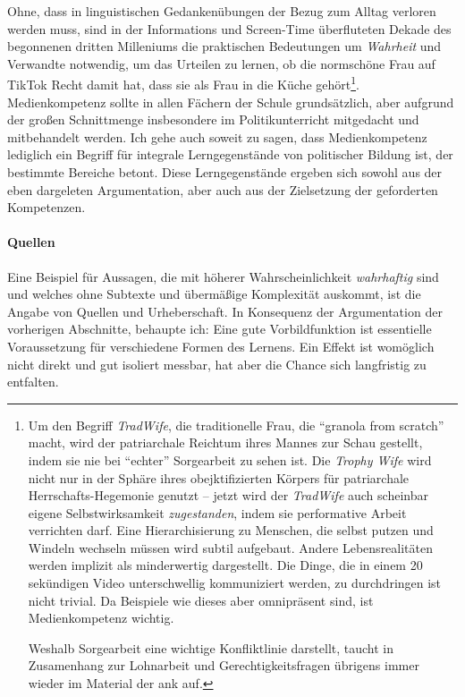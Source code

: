 \bigskip

\noindent Ohne, dass in linguistischen Gedankenübungen der Bezug zum Alltag verloren werden muss, sind in der Informations und Screen-Time überfluteten Dekade des begonnenen dritten Milleniums die praktischen Bedeutungen um \emph{Wahrheit} und Verwandte notwendig, um das Urteilen zu lernen, ob die normschöne Frau auf TikTok Recht damit hat, dass sie als Frau in die Küche gehört\footnote{
    Um den Begriff \emph{TradWife}, die traditionelle Frau, die \enquote{granola from scratch} macht, wird der patriarchale Reichtum ihres Mannes zur Schau gestellt, indem sie nie bei \enquote{echter} Sorgearbeit zu sehen ist. Die \emph{Trophy Wife} wird nicht nur in der Sphäre ihres obejktifizierten Körpers für patriarchale Herrschafts-Hegemonie genutzt -- jetzt wird der \emph{TradWife} auch scheinbar eigene Selbstwirksamkeit \emph{zugestanden}, indem sie performative Arbeit verrichten darf. Eine Hierarchisierung zu Menschen, die selbst putzen und Windeln wechseln müssen wird subtil aufgebaut. Andere Lebensrealitäten werden implizit als minderwertig dargestellt. Die Dinge, die in einem 20 sekündigen Video unterschwellig kommuniziert werden, zu durchdringen ist nicht trivial. Da Beispiele wie dieses aber omnipräsent sind, ist Medienkompetenz wichtig. 
    
    \noindent Weshalb Sorgearbeit eine wichtige Konfliktlinie darstellt, taucht in Zusamenhang zur Lohnarbeit und Gerechtigkeitsfragen übrigens immer wieder im Material der \gls{ank} auf.
}. 
Medienkompetenz sollte in allen Fächern der Schule grundsätzlich, aber aufgrund der großen Schnittmenge insbesondere im Politikunterricht mitgedacht und mitbehandelt werden. Ich gehe auch soweit zu sagen, dass Medienkompetenz lediglich ein Begriff für integrale Lerngegenstände von politischer Bildung ist, der bestimmte Bereiche betont. Diese Lerngegenstände ergeben sich sowohl aus der eben dargeleten Argumentation, aber auch aus der Zielsetzung der geforderten Kompetenzen. 





\paragraph{Quellen}
Eine Beispiel für Aussagen, die mit höherer Wahrscheinlichkeit \emph{wahrhaftig} sind und welches ohne Subtexte und übermäßige Komplexität auskommt, ist die Angabe von Quellen und Urheberschaft.
In Konsequenz der Argumentation der vorherigen Abschnitte, behaupte ich: Eine gute Vorbildfunktion ist essentielle Voraussetzung für verschiedene Formen des Lernens. %
Ein Effekt ist womöglich nicht direkt und gut isoliert messbar, hat aber die Chance sich langfristig zu entfalten.

